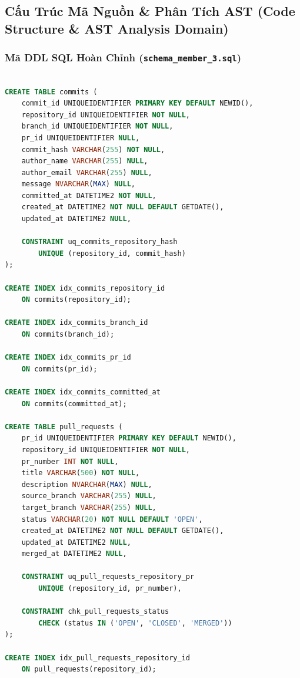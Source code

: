 \subsection{Cấu Trúc Mã Nguồn \& Phân Tích AST (Code Structure \& AST Analysis Domain)}



\subsubsection{Mã DDL SQL Hoàn Chỉnh (\texttt{schema\_member\_3.sql})}

\begin{lstlisting}[language=SQL, breaklines=true, breakatwhitespace=true]

CREATE TABLE commits (
    commit_id UNIQUEIDENTIFIER PRIMARY KEY DEFAULT NEWID(),
    repository_id UNIQUEIDENTIFIER NOT NULL,
    branch_id UNIQUEIDENTIFIER NOT NULL,
    pr_id UNIQUEIDENTIFIER NULL,
    commit_hash VARCHAR(255) NOT NULL,
    author_name VARCHAR(255) NULL,
    author_email VARCHAR(255) NULL,
    message NVARCHAR(MAX) NULL,
    committed_at DATETIME2 NOT NULL,
    created_at DATETIME2 NOT NULL DEFAULT GETDATE(),
    updated_at DATETIME2 NULL,

    CONSTRAINT uq_commits_repository_hash
        UNIQUE (repository_id, commit_hash)
);

CREATE INDEX idx_commits_repository_id
    ON commits(repository_id);

CREATE INDEX idx_commits_branch_id
    ON commits(branch_id);

CREATE INDEX idx_commits_pr_id
    ON commits(pr_id);

CREATE INDEX idx_commits_committed_at
    ON commits(committed_at);

CREATE TABLE pull_requests (
    pr_id UNIQUEIDENTIFIER PRIMARY KEY DEFAULT NEWID(),
    repository_id UNIQUEIDENTIFIER NOT NULL,
    pr_number INT NOT NULL,
    title VARCHAR(500) NOT NULL,
    description NVARCHAR(MAX) NULL,
    source_branch VARCHAR(255) NULL,
    target_branch VARCHAR(255) NULL,
    status VARCHAR(20) NOT NULL DEFAULT 'OPEN',
    created_at DATETIME2 NOT NULL DEFAULT GETDATE(),
    updated_at DATETIME2 NULL,
    merged_at DATETIME2 NULL,

    CONSTRAINT uq_pull_requests_repository_pr
        UNIQUE (repository_id, pr_number),

    CONSTRAINT chk_pull_requests_status
        CHECK (status IN ('OPEN', 'CLOSED', 'MERGED'))
);

CREATE INDEX idx_pull_requests_repository_id
    ON pull_requests(repository_id);


\end{lstlisting}
